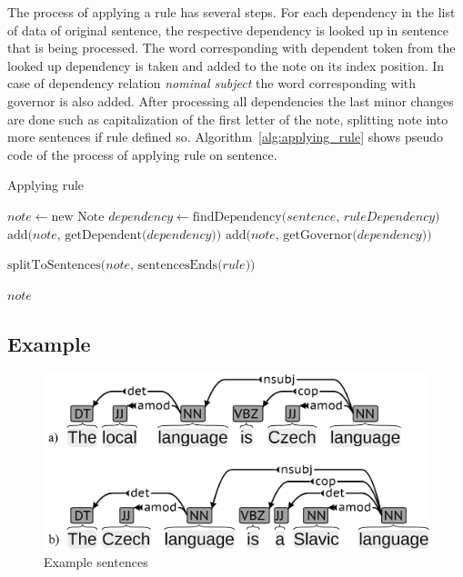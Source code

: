 \documentclass{iitsrc}
\begin{document}
		The process of applying a rule has several steps. For each dependency in the list of data of original sentence, the respective dependency is looked up in sentence that is being processed. The word corresponding with dependent token from the looked up dependency is taken and added to the note on its index position. In case of dependency relation \textit{nominal subject} the word corresponding with governor is also added. After processing all dependencies the last minor changes are done such as capitalization of the first letter of the note, splitting note into more sentences if rule defined so. Algorithm~\ref{alg:applying_rule} shows pseudo code of the process of applying rule on sentence.
	
		\begin{algorithm}
			\caption{Applying rule}\label{alg:applying_rule}
			\begin{algorithmic}[1]
				\State $note \gets \text{new Note}$
				\State $dependency \gets \text{findDependency(} sentence \text{, } ruleDependency \text{)}$
				\State $\text{add(} note \text{, getDependent(} dependency \text{))}$
				\State $\text{add(} note \text{, getGovernor(} dependency \text{))}$
				\EndIf
				\EndIf
				\EndFor
				
				\State $\text{splitToSentences(} note \text{, sentencesEnds(} rule \text{))}$	
				
				\Return $note$
				\EndProcedure
			\end{algorithmic}
		\end{algorithm}
	
	\subsection{Example} \label{subsec:example}
		\begin{figure}[h]
			\begin{center}
				\includegraphics[scale=0.18]{sentences_bw}
				\caption{Example sentences}
				\label{fig:sentences}
			\end{center}
		\end{figure}
		
\end{document}
